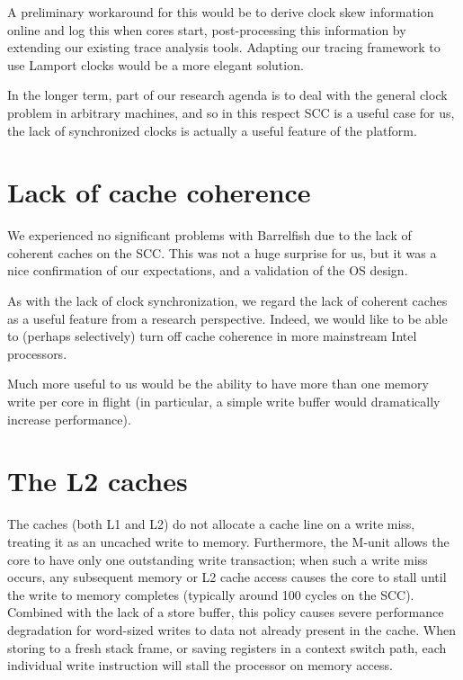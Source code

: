 \documentclass[a4paper,twoside]{report} %
\begin{document}
A preliminary workaround for this would be to derive clock skew
information online and log this when cores start, post-processing this
information by extending our existing trace analysis tools.   Adapting
our tracing framework to use Lamport clocks would be a more elegant
solution. 

In the longer term, part of our research agenda is to deal with the 
general clock problem in arbitrary machines, and so in this respect
SCC is a useful case for us, the lack of synchronized clocks is
actually a useful feature of the platform.  

\section{Lack of cache coherence}

We experienced no significant problems with Barrelfish due to the lack
of coherent caches on the SCC.  This was not a huge surprise for us,
but it was a nice confirmation of our expectations, and a validation
of the OS design. 

As with the lack of clock synchronization, we regard the lack of
coherent caches as a useful feature from a research perspective.
Indeed, we would like to be able to (perhaps selectively) turn off
cache coherence in more mainstream Intel processors. 

Much more useful to us would be the ability to have more than one
memory write per core in flight (in particular, a simple write buffer
would dramatically increase performance). 

\section{The L2 caches}

The caches (both L1 and L2) do not allocate a cache line on a write miss,
treating it as an uncached write to memory. Furthermore, the M-unit allows the
core to have only one outstanding write transaction; when such a write miss
occurs, any subsequent memory or L2 cache access causes the core to stall
until the write to memory completes (typically around 100 cycles on the SCC).
Combined with the lack of a store buffer, this policy causes severe performance
degradation for word-sized writes to data not already present in the cache.
When storing to a fresh stack frame, or saving registers in a context switch
path, each individual write instruction will stall the processor on memory
access.
\end{document}
